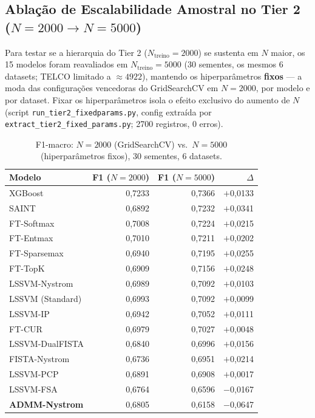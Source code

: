 \documentclass[12pt,a4paper]{article}
\begin{document}
\subsection{Ablação de Escalabilidade Amostral no Tier 2 ($N=2000 \to N=5000$)}
\label{sec:tier2_n5000}

Para testar se a hierarquia do Tier 2 ($N_{\text{treino}}=2000$) se sustenta em
$N$ maior, os 15 modelos foram reavaliados em $N_{\text{treino}}=5000$
(30 sementes, os mesmos 6 datasets; TELCO limitado a $\approx 4922$),
mantendo os hiperparâmetros \textbf{fixos} --- a moda das configurações
vencedoras do GridSearchCV em $N=2000$, por modelo e por dataset. Fixar os
hiperparâmetros isola o efeito exclusivo do aumento de $N$ (script
\texttt{run\_tier2\_fixedparams.py}, config extraída por
\texttt{extract\_tier2\_fixed\_params.py}; 2700 registros, 0 erros).

\begin{table}[H]
\centering
\caption{F1-macro: $N{=}2000$ (GridSearchCV) vs.\ $N{=}5000$ (hiperparâmetros
fixos), 30 sementes, 6 datasets.}
\label{tab:tier2_n5000}
\begin{tabular}{lrrr}
\toprule
\textbf{Modelo} & \textbf{F1 ($N{=}2000$)} & \textbf{F1 ($N{=}5000$)} & \textbf{$\Delta$} \\
\midrule
XGBoost              & 0,7233 & 0,7366 & $+$0,0133 \\
SAINT                & 0,6892 & 0,7232 & $+$0,0341 \\
FT-Softmax           & 0,7008 & 0,7224 & $+$0,0215 \\
FT-Entmax            & 0,7010 & 0,7211 & $+$0,0202 \\
FT-Sparsemax         & 0,6940 & 0,7195 & $+$0,0255 \\
FT-TopK              & 0,6909 & 0,7156 & $+$0,0248 \\
LSSVM-Nystrom        & 0,6989 & 0,7092 & $+$0,0103 \\
LSSVM (Standard)     & 0,6993 & 0,7092 & $+$0,0099 \\
LSSVM-IP             & 0,6942 & 0,7052 & $+$0,0111 \\
FT-CUR               & 0,6979 & 0,7027 & $+$0,0048 \\
LSSVM-DualFISTA      & 0,6840 & 0,6996 & $+$0,0156 \\
FISTA-Nystrom        & 0,6736 & 0,6951 & $+$0,0214 \\
LSSVM-PCP            & 0,6891 & 0,6908 & $+$0,0017 \\
LSSVM-FSA            & 0,6764 & 0,6596 & $-$0,0167 \\
\textbf{ADMM-Nystrom} & 0,6805 & 0,6158 & $-$0,0647 \\
\bottomrule
\end{tabular}
\end{table}
\end{document}
